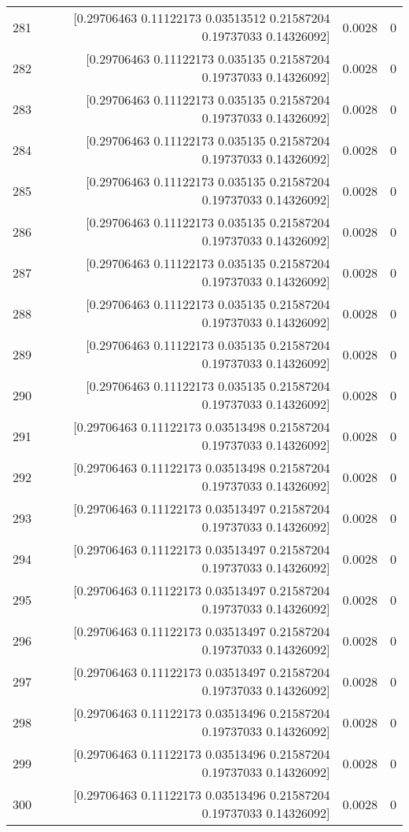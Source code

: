 \begin{longtable}{lrrr}
281 & [0.29706463 0.11122173 0.03513512 0.21587204 0.19737033 0.14326092] & 0.0028 & 0 \\
282 & [0.29706463 0.11122173 0.035135   0.21587204 0.19737033 0.14326092] & 0.0028 & 0 \\
283 & [0.29706463 0.11122173 0.035135   0.21587204 0.19737033 0.14326092] & 0.0028 & 0 \\
284 & [0.29706463 0.11122173 0.035135   0.21587204 0.19737033 0.14326092] & 0.0028 & 0 \\
285 & [0.29706463 0.11122173 0.035135   0.21587204 0.19737033 0.14326092] & 0.0028 & 0 \\
286 & [0.29706463 0.11122173 0.035135   0.21587204 0.19737033 0.14326092] & 0.0028 & 0 \\
287 & [0.29706463 0.11122173 0.035135   0.21587204 0.19737033 0.14326092] & 0.0028 & 0 \\
288 & [0.29706463 0.11122173 0.035135   0.21587204 0.19737033 0.14326092] & 0.0028 & 0 \\
289 & [0.29706463 0.11122173 0.035135   0.21587204 0.19737033 0.14326092] & 0.0028 & 0 \\
290 & [0.29706463 0.11122173 0.035135   0.21587204 0.19737033 0.14326092] & 0.0028 & 0 \\
291 & [0.29706463 0.11122173 0.03513498 0.21587204 0.19737033 0.14326092] & 0.0028 & 0 \\
292 & [0.29706463 0.11122173 0.03513498 0.21587204 0.19737033 0.14326092] & 0.0028 & 0 \\
293 & [0.29706463 0.11122173 0.03513497 0.21587204 0.19737033 0.14326092] & 0.0028 & 0 \\
294 & [0.29706463 0.11122173 0.03513497 0.21587204 0.19737033 0.14326092] & 0.0028 & 0 \\
295 & [0.29706463 0.11122173 0.03513497 0.21587204 0.19737033 0.14326092] & 0.0028 & 0 \\
296 & [0.29706463 0.11122173 0.03513497 0.21587204 0.19737033 0.14326092] & 0.0028 & 0 \\
297 & [0.29706463 0.11122173 0.03513497 0.21587204 0.19737033 0.14326092] & 0.0028 & 0 \\
298 & [0.29706463 0.11122173 0.03513496 0.21587204 0.19737033 0.14326092] & 0.0028 & 0 \\
299 & [0.29706463 0.11122173 0.03513496 0.21587204 0.19737033 0.14326092] & 0.0028 & 0 \\
300 & [0.29706463 0.11122173 0.03513496 0.21587204 0.19737033 0.14326092] & 0.0028 & 0 \\

\end{longtable}

